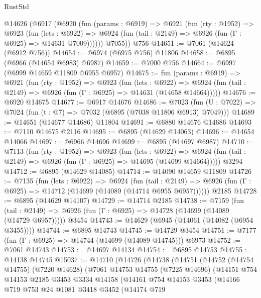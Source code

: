 \begin{lexlean}{RustStd}
\begin{coremodule}
    @14626
      (@6917
        (@6920
          (fun (params : @6919) =>
          @6921
            (fun (rty : @1952) =>
            @6923
              (fun (lets : @6922) =>
              @6924 (fun (tail : @2149) => @6926 (fun (Γ : @6925) => @14631 @7009))))))
        @7055))
    @756
@14651 := @7061 (@14624 (@6912 @756))
@14654 := @6974 (@6975 @756) @11806
@14658 := @6895 (@6966 (@14654 @6983) @6987)
@14659 := @7000 @756
@14664 := @6997 (@6999 @14659 @11809 @6955 @6957)
@14675 := fun (params : @6919) =>
  @6921
    (fun (rty : @1952) =>
    @6923
      (fun (lets : @6922) =>
      @6924 (fun (tail : @2149) => @6926 (fun (Γ : @6925) => @14631 (@14658 @14664)))))
@14676 := @6920 @14675
@14677 := @6917 @14676
@14686 := @7023
    (fun (U : @7022) => @7024 (fun (t : @7) => @7032 (@6895 (@7038 @11806 @6913) @7049)))
@14689 := @14651 (@14677 @14686) @11804
@14691 := @6880 @14676 @14686
@14693 := @7110 @14675 @2116
@14695 := @6895 (@14629 @14063)
@14696 := @14654 @14066
@14697 := @6966 @14696
@14699 := @6895 (@14697 @6987)
@14710 := @7113
    (fun (rty : @1952) =>
    @6923
      (fun (lets : @6922) =>
      @6924 (fun (tail : @2149) => @6926 (fun (Γ : @6925) => @14695 (@14699 @14664)))))
    @3294
@14712 := @6895 (@14629 @14085)
@14714 := @14090 @14659 @11809
@14726 := @7135
    (fun (lets : @6922) =>
    @6924
      (fun (tail : @2149) =>
      @6926 (fun (Γ : @6925) => @14712 (@14699 (@14089 (@14714 @6955 @6957))))))
    @2185
@14728 := @6895 (@14629 @14107)
@14729 := @14714 @2185
@14738 := @7159
    (fun (tail : @2149) => @6926 (fun (Γ : @6925) => @14728 (@14699 (@14089 (@14729 @6957)))))
    @3454
@14743 := @14629 (@6945 (@14061 (@14082 (@6954 @3455))))
@14744 := @6895 @14743
@14745 := @14729 @3454
@14751 := @7177 (fun (Γ : @6925) => @14744 (@14699 (@14089 @14745))) @6973
@14752 := @7061 @14743
@14753 := @14697 @14134
@14754 := @6895 @14753
@14755 := @14138 @14745
@15037 := @14710
    (@14726
      (@14738
        (@14751
          (@14752
            (@14754 @14755)
            (@7220 @14628)
            (@7061
              @14753
              @14755
              (@7225 @14696)
              (@14151
                @754
                @14153
                @2185
                @3453
                @3334
                @14158
                (@14161
                  @754
                  @14153
                  @3453
                  (@14166
                    @719
                    @753
                    @24
                    @1081
                    @3418
                    @3452
                    (@14174
                      @719

\end{coremodule}
\end{lexlean}
